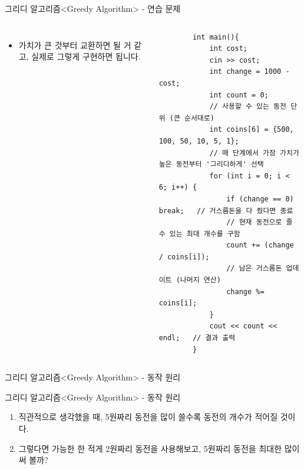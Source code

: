 \begin{frame}[fragile]{그리디 알고리즘}{<Greedy Algorithm> - 연습 문제}
  \begin{columns}[T]
      \vspace{2mm}
      \vspace{8mm}

      \begin{itemize}
        \item 가치가 큰 것부터 교환하면 될 거 같고, 실제로 그렇게 구현하면 됩니다.
      \end{itemize}
      \begin{verbatim}
        int main(){
            int cost;
            cin >> cost;
            int change = 1000 - cost;
            int count = 0;
            // 사용할 수 있는 동전 단위 (큰 순서대로)
            int coins[6] = {500, 100, 50, 10, 5, 1};
            // 매 단계에서 가장 가치가 높은 동전부터 '그리디하게' 선택
            for (int i = 0; i < 6; i++) {
                if (change == 0) break;   // 거스름돈을 다 줬다면 종료
                // 현재 동전으로 줄 수 있는 최대 개수를 구함
                count += (change / coins[i]);
                // 남은 거스름돈 업데이트 (나머지 연산)
                change %= coins[i];
            }
            cout << count << endl;   // 결과 출력
        }
      \end{verbatim}
  \end{columns}
\end{frame}


\begin{frame}{그리디 알고리즘}{<Greedy Algorithm> - 동작 원리}
  \coinexample
\end{frame}

\begin{frame}{그리디 알고리즘}{<Greedy Algorithm> - 동작 원리}
  \coinexample
  \vspace{2mm}
  \begin{enumerate}
    \item 직관적으로 생각했을 때, 5원짜리 동전을 많이 쓸수록 동전의 개수가 적어질 것이다.
    \item \alert{그렇다면 가능한 한 적게 2원짜리 동전을 사용해보고, 5원짜리 동전을 최대한 많이 써 볼까?}
  \end{enumerate}
\end{frame}

